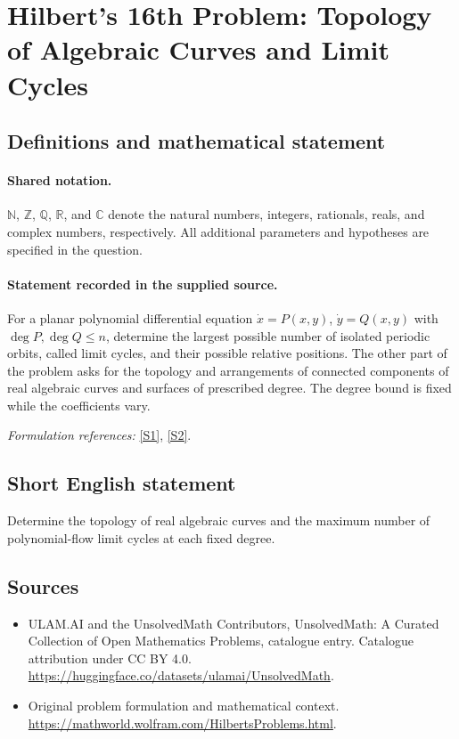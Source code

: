\documentclass[11pt]{article}
\newcommand{\sref}[2]{\hyperlink{source:#1:#2}{[S#2]}}
\begin{document}
\section{Hilbert's 16th Problem: Topology of Algebraic Curves and Limit Cycles}\label{statement}

\subsection{Definitions and mathematical statement}

\paragraph{Shared notation.}$\mathbb N$, $\mathbb Z$, $\mathbb Q$, $\mathbb R$, and $\mathbb C$ denote the natural numbers, integers, rationals, reals, and complex numbers, respectively. All additional parameters and hypotheses are specified in the question.


\paragraph{Statement recorded in the supplied source.}
For a planar polynomial differential equation $\dot x=P(x,y)$, $\dot y=Q(x,y)$ with $\deg P,\deg Q\leq n$, determine the largest possible number of isolated periodic orbits, called limit cycles, and their possible relative positions. The other part of the problem asks for the topology and arrangements of connected components of real algebraic curves and surfaces of prescribed degree. The degree bound is fixed while the coefficients vary.
\par\smallskip\textit{Formulation references:} \sref{statement}{1}, \sref{statement}{2}.
\subsection{Short English statement}
Determine the topology of real algebraic curves and the maximum number of polynomial-flow limit cycles at each fixed degree.
\subsection{Sources}
\begin{itemize}
\item[\hypertarget{source:statement:1}{S1}] ULAM.AI and the UnsolvedMath Contributors, UnsolvedMath: A Curated Collection of Open Mathematics Problems, catalogue entry. Catalogue attribution under CC BY 4.0.
\url{https://huggingface.co/datasets/ulamai/UnsolvedMath}.
\item[\hypertarget{source:statement:2}{S2}] Original problem formulation and mathematical context.
\url{https://mathworld.wolfram.com/HilbertsProblems.html}.
\end{itemize}
\label{end:statement}
\end{document}
